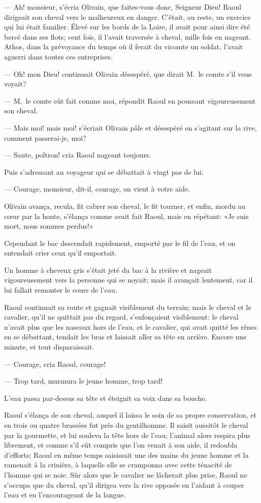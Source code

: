 — Ah! monsieur, s'écria Olivain, que faites-vous donc, Seigneur Dieu!
Raoul dirigeait son cheval vers le malheureux en danger. C'était, au reste, un exercice qui lui était familier. Élevé sur les bords de la Loire, il avait pour ainsi dire été bercé dans ses flots; cent fois, il l'avait traversée à cheval, mille fois en nageant. Athos, dans la prévoyance du temps où il ferait du vicomte un soldat, l'avait aguerri dans toutes ces entreprises.

— Oh! mon Dieu! continuait Olivain désespéré, que dirait M.~le comte s'il vous voyait?

— M.~le comte eût fait comme moi, répondit Raoul en poussant vigoureusement son cheval.

— Mais moi! mais moi! s'écriait Olivain pâle et désespéré en s'agitant sur la rive, comment passerai-je, moi?

— Saute, poltron! cria Raoul nageant toujours.

Puis s'adressant au voyageur qui se débattait à vingt pas de lui:

— Courage, monsieur, dit-il, courage, on vient à votre aide.

Olivain avança, recula, fit cabrer son cheval, le fit tourner, et enfin, mordu au cœur par la honte, s'élança comme avait fait Raoul, mais en répétant: «Je suis mort, nous sommes perdus!»

Cependant le bac descendait rapidement, emporté par le fil de l'eau, et on entendait crier ceux qu'il emportait.

Un homme à cheveux gris s'était jeté du bac à la rivière et nageait vigoureusement vers la personne qui se noyait; mais il avançait lentement, car il lui fallait remonter le cours de l'eau.

Raoul continuait sa route et gagnait visiblement du terrain; mais le cheval et le cavalier, qu'il ne quittait pas du regard, s'enfonçaient visiblement: le cheval n'avait plus que les naseaux hors de l'eau, et le cavalier, qui avait quitté les rênes en se débattant, tendait les bras et laissait aller sa tête en arrière. Encore une minute, et tout disparaissait.

— Courage, cria Raoul, courage!

— Trop tard, murmura le jeune homme, trop tard!

L'eau passa par-dessus sa tête et éteignit sa voix dans sa bouche.

Raoul s'élança de son cheval, auquel il laissa le soin de sa propre conservation, et en trois ou quatre brassées fut près du gentilhomme. Il saisit aussitôt le cheval par la gourmette, et lui souleva la tête hors de l'eau; l'animal alors respira plus librement, et comme s'il eût compris que l'on venait à son aide, il redoubla d'efforts; Raoul en même temps saisissait une des mains du jeune homme et la ramenait à la crinière, à laquelle elle se cramponna avec cette ténacité de l'homme qui se noie. Sûr alors que le cavalier ne lâcherait plus prise, Raoul ne s'occupa que du cheval, qu'il dirigea vers la rive opposée en l'aidant à couper l'eau et en l'encourageant de la langue.


